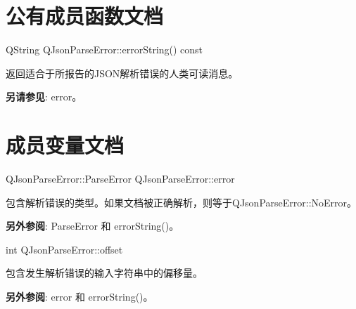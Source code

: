 \section{公有成员函数文档}

QString QJsonParseError::errorString() const

返回适合于所报告的JSON解析错误的人类可读消息。

\textbf{另请参见}: error。


\section{成员变量文档}

QJsonParseError::ParseError QJsonParseError::error

包含解析错误的类型。如果文档被正确解析，则等于QJsonParseError::NoError。

\textbf{另外参阅}: ParseError 和 errorString()。

int QJsonParseError::offset

包含发生解析错误的输入字符串中的偏移量。

\textbf{另外参阅}: error 和 errorString()。

